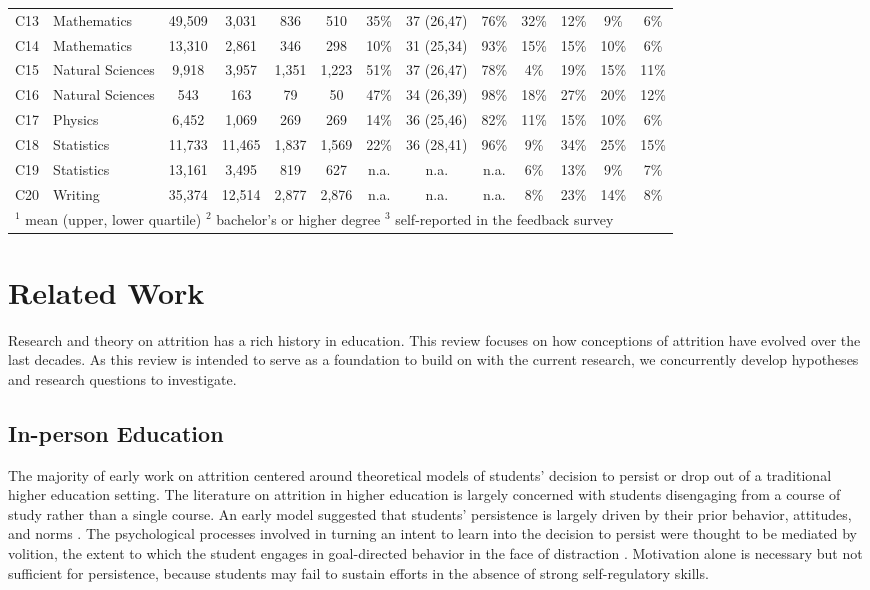 \documentclass{sigchi}\usepackage[]{graphicx}\usepackage[]{color}
\begin{document}
\begin{table}[th]
\begin{tabular}{llccccccccccc}
C13 & Mathematics & 49,509 & 3,031 & 836 & 510 & 35\% & 37 (26,47) & 76\% & 32\% & 12\% & 9\% & 6\%\\
C14 & Mathematics & 13,310 & 2,861 & 346 & 298 & 10\% & 31 (25,34) & 93\% & 15\% & 15\% & 10\% & 6\%\\
C15 & Natural Sciences & 9,918 & 3,957 & 1,351 & 1,223 & 51\% & 37 (26,47) & 78\% & 4\% & 19\% & 15\% & 11\%\\
C16 & Natural Sciences & 543 & 163 & 79 & 50 & 47\% & 34 (26,39) & 98\% & 18\% & 27\% & 20\% & 12\%\\
C17 & Physics & 6,452 & 1,069 & 269 & 269 & 14\% & 36 (25,46) & 82\% & 11\% & 15\% & 10\% & 6\%\\
C18 & Statistics & 11,733 & 11,465 & 1,837 & 1,569 & 22\% & 36 (28,41) & 96\% & 9\% & 34\% & 25\% & 15\%\\
C19 & Statistics & 13,161 & 3,495 & 819 & 627 & n.a. & n.a. & n.a. & 6\% & 13\% & 9\% & 7\%\\
C20 & Writing & 35,374 & 12,514 & 2,877 & 2,876 & n.a. & n.a. & n.a. & 8\% & 23\% & 14\% & 8\%\\
\bottomrule
\multicolumn{13}{l}{$^1$ mean (upper, lower quartile)  $^2$ bachelor's or higher degree  $^3$ self-reported in the feedback survey}
\end{tabular}
\end{table}


\section{Related Work}

Research and theory on attrition has a rich history in education. This review focuses on how conceptions of attrition have evolved over the last decades.  As this review is intended to serve as a foundation to build on with the current research, we concurrently develop hypotheses and research questions to investigate.

\subsection{In-person Education}

The majority of early work on attrition centered around theoretical models of students' decision to persist or drop out of a traditional higher education setting. The literature on attrition in higher education is largely concerned with students disengaging from a course of study rather than a single course. An early model suggested that students' persistence is largely driven by their prior behavior, attitudes, and norms \cite{fishbein1975belief}. The psychological processes involved in turning an intent to learn into the decision to persist were thought to be mediated by volition, the extent to which the student engages in goal-directed behavior in the face of distraction \cite{corno2001volitional}. Motivation alone is necessary but not sufficient for persistence, because students may fail to sustain efforts in the absence of strong self-regulatory skills.
\end{document}
